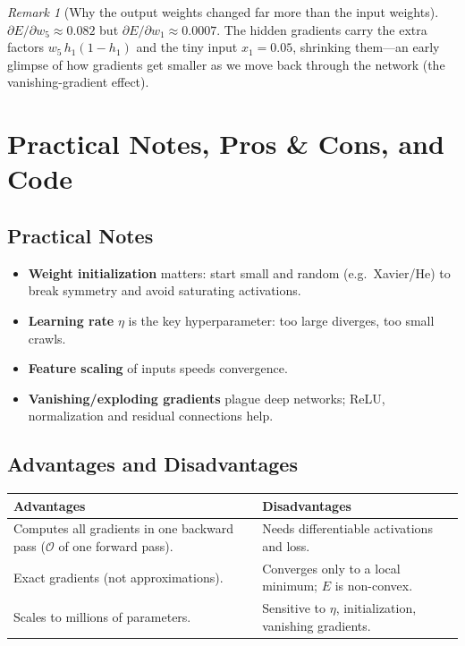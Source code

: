 \documentclass[11pt,a4paper]{report}
\theoremstyle{definition}
\theoremstyle{remark}
\newtheorem*{remark}{Remark}
\begin{document}
\begin{remark}[Why the output weights changed far more than the input weights]
$\partial E/\partial w_5\approx0.082$ but $\partial E/\partial w_1\approx0.0007$.
The hidden gradients carry the extra factors $w_5\,h_1(1-h_1)$ and the tiny
input $x_1=0.05$, shrinking them---an early glimpse of how gradients get smaller
as we move back through the network (the vanishing-gradient effect).
\end{remark}

\chapter{Practical Notes, Pros \& Cons, and Code}

\section{Practical Notes}
\begin{itemize}[nosep]
  \item \textbf{Weight initialization} matters: start small and random (e.g.\
        Xavier/He) to break symmetry and avoid saturating activations.
  \item \textbf{Learning rate} $\eta$ is the key hyperparameter: too large
        diverges, too small crawls.
  \item \textbf{Feature scaling} of inputs speeds convergence.
  \item \textbf{Vanishing/exploding gradients} plague deep networks; ReLU,
        normalization and residual connections help.
\end{itemize}

\section{Advantages and Disadvantages}
\begin{center}
\begin{tabular}{@{}p{6.4cm}p{6.4cm}@{}}
\toprule
\textbf{Advantages} & \textbf{Disadvantages}\\
\midrule
Computes all gradients in one backward pass ($\mathcal{O}$ of one forward pass).
& Needs differentiable activations and loss.\\
Exact gradients (not approximations). & Converges only to a local minimum; $E$ is
non-convex.\\
Scales to millions of parameters. & Sensitive to $\eta$, initialization,
vanishing gradients.\\
\bottomrule
\end{tabular}
\end{center}
\end{document}
